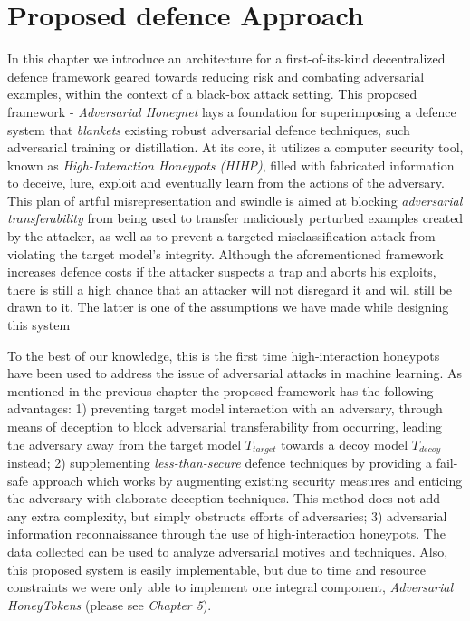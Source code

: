 \documentclass[grad,lot,lof,11pt,oneside,onehalfspace]{RUthesis}
\begin{document}
\chapter{Proposed defence Approach}
In this chapter we introduce an architecture for a first-of-its-kind decentralized  defence framework geared towards reducing risk and combating adversarial examples, within the context of a black-box attack setting. This proposed framework - \textit{Adversarial Honeynet} lays a foundation for  superimposing a defence system that \textit{blankets} existing robust adversarial defence techniques, such adversarial training or distillation. At its core, it utilizes a computer security tool, known as \textit{High-Interaction Honeypots (HIHP)}, filled with fabricated  information  to deceive, lure, exploit and eventually learn from the actions of the adversary. This plan of artful misrepresentation and swindle is aimed at blocking \textit{adversarial transferability} from being used to transfer maliciously perturbed examples created by the attacker, as well as to prevent a targeted misclassification attack from violating the target model's integrity. Although the aforementioned framework increases  defence costs if the attacker suspects a trap and aborts his exploits, there is still a high chance that an attacker will not disregard it and will still be drawn to it. The latter is one of the  assumptions we have made while designing this system 

 To the best of our knowledge, this is the first time high-interaction honeypots have been used to address the issue of adversarial attacks in machine learning. As mentioned in the previous chapter the proposed framework has the following advantages: 1) preventing target model interaction with an adversary, through means of deception to block adversarial transferability from occurring, leading the adversary away from the target model \textit{$T_{target}$} towards a decoy model \textit{$T_{decoy}$} instead; 2)  supplementing \textit{less-than-secure} defence techniques by providing a fail-safe approach which works by augmenting existing security measures and enticing the adversary with elaborate deception techniques. This method does not add any extra complexity, but simply obstructs efforts of adversaries; 3) adversarial information reconnaissance through the use of high-interaction honeypots. The data collected  can be used to analyze  adversarial motives and techniques. Also, this proposed system is easily implementable, but due to time and resource constraints we were only able to implement one integral component, \textit{Adversarial HoneyTokens} (please see \textit{Chapter 5}).  
\end{document}
